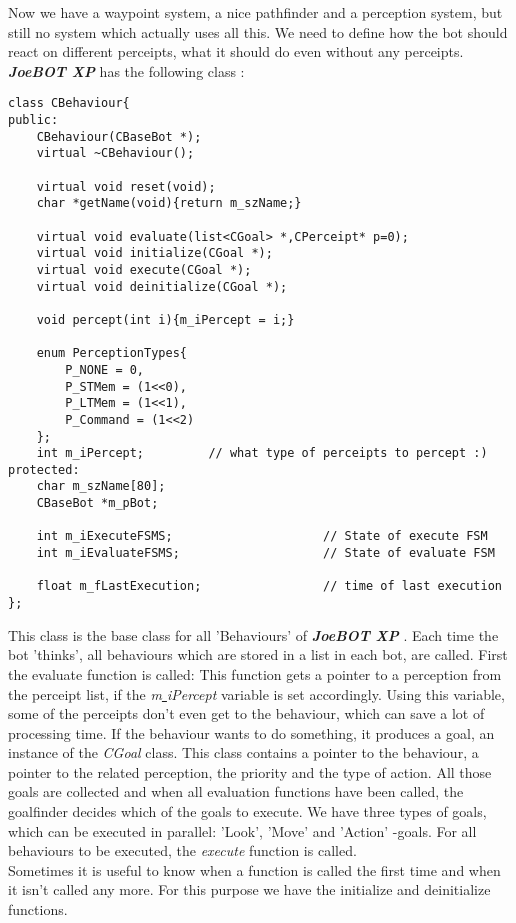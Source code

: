 \documentclass[12pt]{article}
\newcommand {\joebotxp}{\textit{\textbf{JoeBOT XP}} }
\begin{document}
Now we have a waypoint system, a nice pathfinder and a perception system, but still no system which actually uses all this. We need to define how the bot should react on different perceipts, what it should do even without any perceipts.\\
\joebotxp has the following class :

\linespread{1.0}
\scriptsize
\begin{verbatim}
class CBehaviour{
public:
    CBehaviour(CBaseBot *);
    virtual ~CBehaviour();

    virtual void reset(void);
    char *getName(void){return m_szName;}

    virtual void evaluate(list<CGoal> *,CPerceipt* p=0);
    virtual void initialize(CGoal *);
    virtual void execute(CGoal *);
    virtual void deinitialize(CGoal *);

    void percept(int i){m_iPercept = i;}

    enum PerceptionTypes{
        P_NONE = 0,
        P_STMem = (1<<0),
        P_LTMem = (1<<1),
        P_Command = (1<<2)
    };
    int m_iPercept;			// what type of perceipts to percept :)
protected:
    char m_szName[80];
    CBaseBot *m_pBot;

    int m_iExecuteFSMS;						// State of execute FSM
    int m_iEvaluateFSMS;					// State of evaluate FSM

    float m_fLastExecution;					// time of last execution
};
\end{verbatim}
\linespread{1.3}
\normalsize

This class is the base class for all 'Behaviours' of \joebotxp. Each time the bot 'thinks', all behaviours which are stored in a list in each bot, are called. First the evaluate function is called: This function gets a pointer to a perception from the perceipt list, if the \textit{m\underline{ }iPercept} variable is set accordingly. Using this variable, some of the perceipts don't even get to the behaviour, which can save a lot of processing time. If the behaviour wants to do something, it produces a goal, an instance of the \textit{CGoal} class. This class contains a pointer to the behaviour, a pointer to the related perception, the priority and the type of action. All those goals are collected and when all evaluation functions have been called, the goalfinder decides which of the goals to execute. We have three types of goals, which can be executed in parallel: 'Look', 'Move' and 'Action' -goals. For all behaviours to be executed, the \textit{execute} function is called.\\
Sometimes it is useful to know when a function is called the first time and when it isn't called any more. For this purpose we have the initialize and deinitialize functions.
\end{document}

